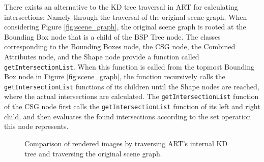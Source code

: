 There exists an alternative to the KD tree traversal in ART for calculating intersections: Namely through the traversal of the original scene graph. When considering Figure \ref{fig:scene_graph}, the original scene graph is rooted at the Bounding Box node that is a child of the BSP Tree node. The classes corresponding to the Bounding Boxes node, the CSG node, the Combined Attributes node, and the Shape node provide a function called \texttt{getIntersectionList}. When this function is called from the topmost Bounding Box node in Figure \ref{fig:scene_graph}, the function recursively calls the \texttt{getIntersectionList} functions of its children until the Shape nodes are reached, where the actual intersections are calculated. The \texttt{getIntersectionList} function of the CSG node first calls the \texttt{getIntersectionList} function of its left and right child, and then evaluates the found intersections according to the set operation this node represents.


\begin{figure}[!tbp]
	\centering
	\hfil
	\caption{Comparison of rendered images by traversing ART's internal KD tree and traversing the original scene graph.}
	\label{fig:org_scenegraph_comp}
\end{figure}

